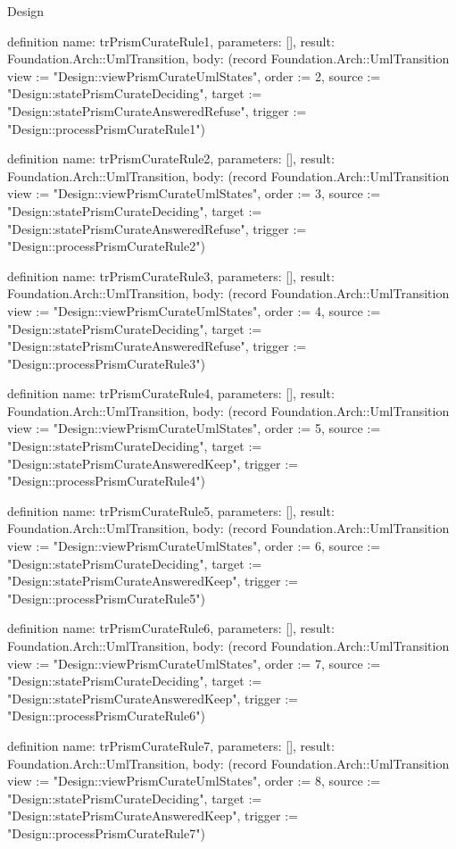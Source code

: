 \begin{lexlean}{Design}
\begin{semanticmodule}
definition{
  name: trPrismCurateRule1,
  parameters: [],
  result: Foundation.Arch::UmlTransition,
  body: (record Foundation.Arch::UmlTransition {view := "Design::viewPrismCurateUmlStates", order := 2, source := "Design::statePrismCurateDeciding", target := "Design::statePrismCurateAnsweredRefuse", trigger := "Design::processPrismCurateRule1"})
}

definition{
  name: trPrismCurateRule2,
  parameters: [],
  result: Foundation.Arch::UmlTransition,
  body: (record Foundation.Arch::UmlTransition {view := "Design::viewPrismCurateUmlStates", order := 3, source := "Design::statePrismCurateDeciding", target := "Design::statePrismCurateAnsweredRefuse", trigger := "Design::processPrismCurateRule2"})
}

definition{
  name: trPrismCurateRule3,
  parameters: [],
  result: Foundation.Arch::UmlTransition,
  body: (record Foundation.Arch::UmlTransition {view := "Design::viewPrismCurateUmlStates", order := 4, source := "Design::statePrismCurateDeciding", target := "Design::statePrismCurateAnsweredRefuse", trigger := "Design::processPrismCurateRule3"})
}

definition{
  name: trPrismCurateRule4,
  parameters: [],
  result: Foundation.Arch::UmlTransition,
  body: (record Foundation.Arch::UmlTransition {view := "Design::viewPrismCurateUmlStates", order := 5, source := "Design::statePrismCurateDeciding", target := "Design::statePrismCurateAnsweredKeep", trigger := "Design::processPrismCurateRule4"})
}

definition{
  name: trPrismCurateRule5,
  parameters: [],
  result: Foundation.Arch::UmlTransition,
  body: (record Foundation.Arch::UmlTransition {view := "Design::viewPrismCurateUmlStates", order := 6, source := "Design::statePrismCurateDeciding", target := "Design::statePrismCurateAnsweredKeep", trigger := "Design::processPrismCurateRule5"})
}

definition{
  name: trPrismCurateRule6,
  parameters: [],
  result: Foundation.Arch::UmlTransition,
  body: (record Foundation.Arch::UmlTransition {view := "Design::viewPrismCurateUmlStates", order := 7, source := "Design::statePrismCurateDeciding", target := "Design::statePrismCurateAnsweredKeep", trigger := "Design::processPrismCurateRule6"})
}

definition{
  name: trPrismCurateRule7,
  parameters: [],
  result: Foundation.Arch::UmlTransition,
  body: (record Foundation.Arch::UmlTransition {view := "Design::viewPrismCurateUmlStates", order := 8, source := "Design::statePrismCurateDeciding", target := "Design::statePrismCurateAnsweredKeep", trigger := "Design::processPrismCurateRule7"})
}


\end{semanticmodule}
\end{lexlean}
